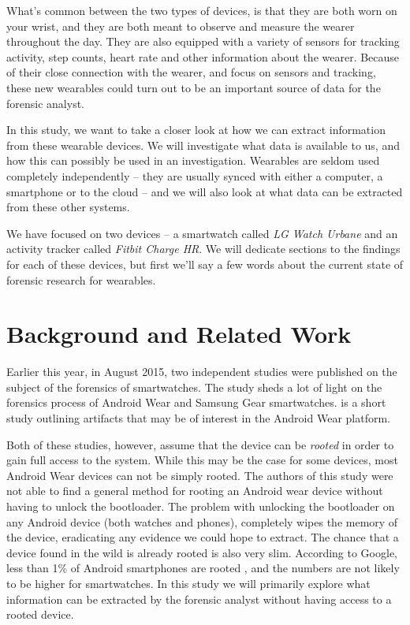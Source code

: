 \documentclass[a4paper,11pt,dvips]{article}
\begin{document}
What's common between the two types of devices, is that they are both worn on your wrist, and they are both meant to observe and measure the wearer throughout the day. They are also equipped with a variety of sensors for tracking activity, step counts, heart rate and other information about the wearer. Because of their close connection with the wearer, and focus on sensors and tracking, these new wearables could turn out to be an important source of data for the forensic analyst.

In this study, we want to take a closer look at how we can extract information from these wearable devices. We will investigate what data is available to us, and how this can possibly be used in an investigation. Wearables are seldom used completely independently -- they are usually synced with either a computer, a smartphone or to the cloud -- and we will also look at what data can be extracted from these other systems.

We have focused on two devices -- a smartwatch called \textit{LG Watch Urbane} and an activity tracker called \textit{Fitbit Charge HR}. We will dedicate sections to the findings for each of these devices, but first we'll say a few words about the current state of forensic research for wearables.


\section{Background and Related Work}

Earlier this year, in August 2015, two independent studies were published on the subject of the forensics of smartwatches. The study \cite{baggili2015watch} sheds a lot of light on the forensics process of Android Wear and Samsung Gear smartwatches. \cite{rughanianalysis} is a short study outlining artifacts that may be of interest in the Android Wear platform.

Both of these studies, however, assume that the device can be \textit{rooted} in order to gain full access to the system. While this may be the case for some devices, most Android Wear devices can not be simply rooted. The authors of this study were not able to find a general method for rooting an Android wear device without having to unlock the bootloader. The problem with unlocking the bootloader on any Android device (both watches and phones), completely wipes the memory of the device, eradicating any evidence we could hope to extract. The chance that a device found in the wild is already rooted is also very slim. According to Google, less than 1\% of Android smartphones are rooted \citep{Google:2014}, and the numbers are not likely to be higher for smartwatches. In this study we will primarily explore what information can be extracted by the forensic analyst without having access to a rooted device.
\end{document}
